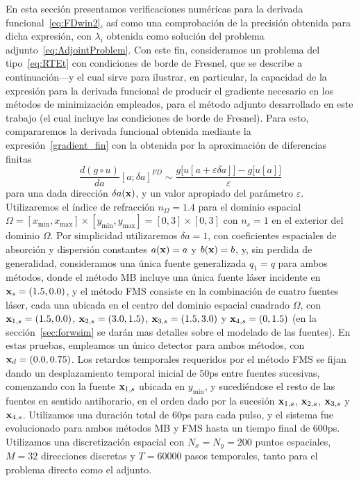  En esta sección presentamos verificaciones numéricas para la derivada 
 funcional~\eqref{eq:FDwin2}, así como una comprobación de la precisión 
 obtenida para dicha expresión, con $\lambda_i$ obtenida como solución del 
 problema adjunto~\eqref{eq:AdjointProblem}. Con este fin, 
 consideramos un problema del tipo~\eqref{eq:RTEt} con condiciones 
 de borde de Fresnel, que se describe a continuación---y el cual 
 sirve para ilustrar, en particular, la capacidad de la expresión 
 para la derivada funcional de producir el gradiente necesario 
 en los métodos de minimización empleados, para el método adjunto desarrollado en este trabajo (el cual incluye las condiciones de borde de Fresnel). 
 Para esto, compararemos la derivada funcional obtenida mediante la expresión~\eqref{gradient_fin} con la obtenida por la aproximación 
 de diferencias finitas
 \begin{equation}
  \frac{d (g \circ u)}{da}[a;\delta a]^{FD} \sim
  \frac{g\big[u[a+\varepsilon \delta a]\big]
    -g\big[u[a]\big]}{\varepsilon}
\label{eq:ObjFD}
\end{equation}
para una dada dirección $\delta a(\mathbf{x})$, y un valor apropiado del parámetro $\varepsilon$. 
Utilizaremos el índice de refracción $n_{\Omega}=1.4$ para el dominio espacial $\Omega=[x_{\text{min}},x_{\text{max}}]\times[y_{\text{min}},y_{\text{max}}]=[0,3]\times[0,3]$ 
con $n_s=1$ en el exterior del dominio $\Omega$.  Por simplicidad utilizaremos $\delta a=1$, 
con coeficientes espaciales de absorción y dispersión constantes $a(\mathbf{x})=a$ y $b(\mathbf{x})=b$, 
y, sin perdida de generalidad, consideramos una única fuente generalizada $q_1 = q$ 
para ambos métodos, donde el método MB incluye una única fuente láser 
incidente en $\mathbf{x}_s=(1.5,0.0)$, y el método FMS consiste en la combinación 
de cuatro fuentes láser, cada una ubicada en el centro del dominio espacial cuadrado 
$\Omega$, con $\mathbf{x}_{1,s}=(1.5,0.0)$, $\mathbf{x}_{2,s}=(3.0,1.5)$, $\mathbf{x}_{3,s}=(1.5,3.0)$ 
y  $\mathbf{x}_{4,s}=(0,1.5)$ (en la sección~\ref{sec:forwsim} se darán mas detalles 
sobre el modelado de las fuentes). En estas pruebas, empleamos un único 
detector para ambos métodos, con $\mathbf{x}_d=(0.0,0.75)$. Los retardos 
temporales requeridos por el método FMS se fijan dando un desplazamiento 
temporal inicial de $50$ps entre fuentes sucesivas, comenzando con la fuente 
 $\mathbf{x}_{1,s}$ ubicada en $y_{\text{min}}$, y sucediéndose el resto de las fuentes 
 en sentido antihorario, en el orden dado por la sucesión $\mathbf{x}_{1,s}$, $\mathbf{x}_{2,s}$, $\mathbf{x}_{3,s}$ y $\mathbf{x}_{4,s}$. Utilizamos una duración total de $60$ps para cada pulso, y el sistema 
 fue evolucionado para ambos métodos MB y FMS hasta un tiempo final de $600$ps. 
 Utilizamos una discretización espacial con $N_x=N_y=200$ puntos espaciales, 
 $M=32$ direcciones discretas y $T=60000$ pasos temporales, tanto para el 
 problema directo como el adjunto. 
 
